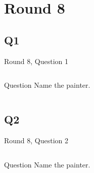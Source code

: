 \documentclass[11pt]{beamer}
\begin{document}
\def\thisSectionName{Famous Paintings}
\section{Round 8}
    

\subsection*{Q1}
\begin{frame}[t]{Round 8, Question 1}
\vspace{0.5em}
\begin{columns}[T,totalwidth=\linewidth]
\begin{column}{0.25\linewidth}
\begin{block}{Question}
Name the painter.
\end{block}
\end{column}
\begin{column}{0.7\linewidth}
\begin{center}
\texttt{[image: \{Images/monet]}.jpg}
\end{center}
\end{column}
\end{columns}
\end{frame}
    

\subsection*{Q2}
\begin{frame}[t]{Round 8, Question 2}
\vspace{0.5em}
\begin{columns}[T,totalwidth=\linewidth]
\begin{column}{0.25\linewidth}
\begin{block}{Question}
Name the painter.
\end{block}
\end{column}
\begin{column}{0.7\linewidth}
\begin{center}
\texttt{[image: \{Images/hockney]}.jpg}
\end{center}
\end{column}
\end{columns}
\end{frame}
    
\end{document}
